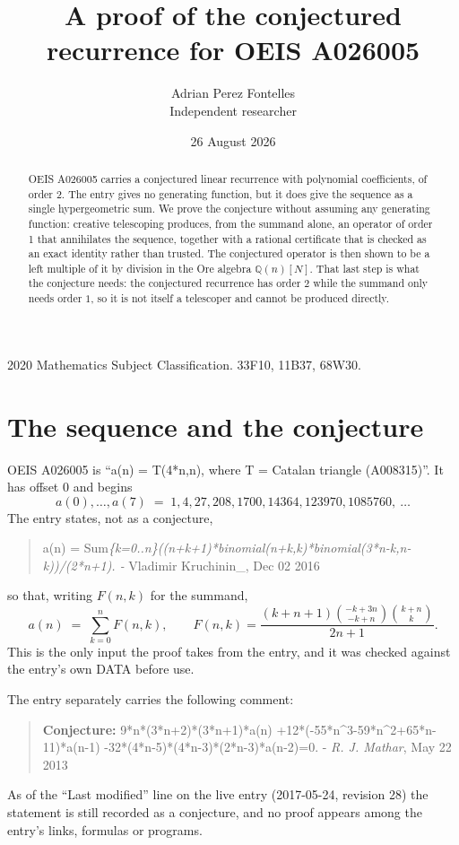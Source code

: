 \documentclass[11pt,a4paper]{article}
\title{A proof of the conjectured recurrence for OEIS A026005}
\author{Adrian Perez Fontelles\\ \small Independent researcher}
\date{26 August 2026}
\theoremstyle{plain}
\theoremstyle{definition}
\begin{document}
\maketitle

\begin{abstract}
OEIS A026005 carries a conjectured linear recurrence with polynomial coefficients, of
order 2. The entry gives no generating function, but it does give the sequence as
a single hypergeometric sum. We prove the conjecture without assuming any generating
function: creative telescoping produces, from the summand alone, an operator of order
1 that annihilates the sequence, together with a rational certificate that is
checked as an exact identity rather than trusted. The conjectured operator is then shown
to be a left multiple of it by division in the Ore algebra $\mathbb{Q}(n)[N]$. That last
step is what the conjecture needs: the conjectured recurrence has order $2$ while the summand only needs order $1$, so it is not itself a telescoper and cannot be produced directly.
\end{abstract}

\noindent\small 2020 Mathematics Subject Classification. 33F10, 11B37, 68W30.\normalsize

\section{The sequence and the conjecture}

OEIS A026005 is ``a(n) = T(4*n,n), where T = Catalan triangle (A008315)''. It has offset $0$ and begins
\[
a(0),\dots,a(7)\;=\;1, 4, 27, 208, 1700, 14364, 123970, 1085760,\ \dots
\]
The entry states, not as a conjecture,
\begin{quote}\small
a(n) = Sum\emph{\{k=0..n\}((n+k+1)*binomial(n+k,k)*binomial(3*n-k,n-k))/(2*n+1). - }Vladimir Kruchinin\_, Dec 02 2016
\end{quote}
so that, writing $F(n,k)$ for the summand,
\begin{equation}\label{eq:sum}
a(n)\;=\;\sum_{k=0}^{n}F(n,k),
\qquad F(n,k)=\frac{\left(k + n + 1\right) {\binom{- k + 3 n}{- k + n}} {\binom{k + n}{k}}}{2 n + 1} .
\end{equation}
This is the only input the proof takes from the entry, and it was checked against the
entry's own DATA before use.

The entry separately carries the following comment:
\begin{quote}\small
\textbf{Conjecture:} 9*n*(3*n+2)*(3*n+1)*a(n) +12*(-55*n\^{}3-59*n\^{}2+65*n-11)*a(n-1) -32*(4*n-5)*(4*n-3)*(2*n-3)*a(n-2)=0. - \emph{R. J. Mathar}, May 22 2013
\end{quote}
As of the ``Last modified'' line on the live entry (2017-05-24, revision 28) the
statement is still recorded as a conjecture, and no proof appears among the entry's links,
formulas or programs.
\end{document}
